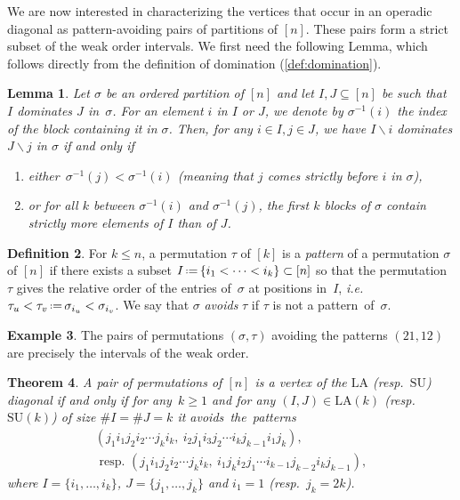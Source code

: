 \documentclass{amsart}
\newcommand{\darkblue}{\color{darkblue}} %
\newtheorem{theorem}{Theorem}[section]
\newtheorem{lemma}[theorem]{Lemma}
\theoremstyle{definition}
\newtheorem{definition}[theorem]{Definition}
\newtheorem{example}[theorem]{Example}
\newcommand{\ssm}{\smallsetminus} %
\newcommand{\eqdef}{\mbox{\,\raisebox{0.2ex}{\scriptsize\ensuremath{\mathrm:}}\ensuremath{=}\,}} %
\newcommand{\card}[1]{\##1} %
\newcommand{\ie}{\textit{i.e.}~} %
\newcommand{\resp}{resp.~} %
\newcommand{\defn}[1]{\textsl{\darkblue #1}} %
\newcommand{\SU}{\mathrm{SU}}
\newcommand{\LA}{\mathrm{LA}}
\begin{document}
We are now interested in characterizing the vertices that occur in an operadic diagonal as pattern-avoiding pairs of partitions of $[n]$. 
These pairs form a strict subset of the weak order intervals. 
We first need the following Lemma, which follows directly from the definition of domination (\cref{def:domination}).

\begin{lemma}
\label{lem:Coherent Domination}
Let $\sigma$ be an ordered partition of $[n]$ and let $I,J \subseteq [n]$ be such that $I$ dominates $J$ in~$\sigma$. 
For an element $i$ in $I$ or $J$, we denote by $\sigma^{-1}(i)$ the index of the block containing it in $\sigma$. 
Then, for any $i \in I,j \in J$, we have $I\ssm i$ dominates $J\ssm j$ in $\sigma$ if and only if
\begin{enumerate}
\item either~$\sigma^{-1}(j) < \sigma^{-1}(i)$ (meaning that $j$ comes strictly before $i$ in $\sigma$),
\item or for all $k$ between $\sigma^{-1}(i)$ and $\sigma^{-1}(j)$, the first $k$ blocks of $\sigma$ contain strictly more elements of $I$ than of $J$.
\end{enumerate}
\end{lemma}


\begin{definition}
For $k\leq n$, a permutation $\tau$ of $[k]$ is a \defn{pattern} of a permutation $\sigma$ of $[n]$ if there exists a subset $I \eqdef \{i_1 < \dots < i_k\} \subset [n]$ so that the permutation~$\tau$ gives the relative order of the entries of~$\sigma$ at positions in~$I$, \ie $\tau_u < \tau_v \eqdef \sigma_{i_u} < \sigma_{i_v}$.
We say that $\sigma$ \defn{avoids} $\tau$ if $\tau$ is not a pattern~of~$\sigma$. 
\end{definition}

\begin{example}
The pairs of permutations $(\sigma,\tau)$ avoiding the patterns $(21,12)$ are precisely the intervals of the weak order. 
\end{example}

\begin{theorem}
\label{thm:patterns}
A pair of permutations of $[n]$ is a vertex of the $\LA$ (\resp $\SU$) diagonal if and only if for any~$k\geq 1$ and for any $(I,J) \in \LA(k)$ (\resp $\SU(k)$) of size $\card{I}=\card{J}=k$ it avoids~the~patterns 
\begin{align}
(j_1 i_1 j_2 i_2 \cdots j_k i_k,\ i_2 j_1 i_3 j_2 \cdots i_k j_{k-1} i_1 j_k), \tag{LA} \label{eq:pattern} \\
\text{ \resp } (j_1 i_1 j_2 i_2 \cdots j_k i_k, \ i_1 j_k i_2 j_1 \cdots i_{k-1} j_{k-2}i_k j_{k-1}), \tag{SU}
\end{align}
where $I=\{i_1,\dots,i_k\}$, $J=\{j_1,\dots,j_k\}$ and $i_1=1$ (\resp $j_k=2k$).
\end{theorem}
\end{document}
